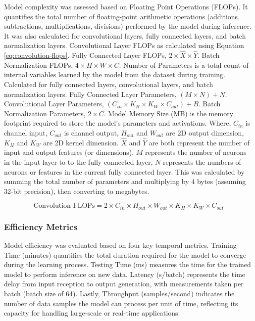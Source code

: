 \documentclass[preprint,12pt]{elsarticle}
\begin{document}
Model complexity was assessed based on Floating Point Operations (FLOPs). It quantifies the total number of floating-point arithmetic operations (additions, subtractions, multiplications, divisions) performed by the model during inference. It was also calculated for convolutional layers, fully connected layers, and batch normalization layers. Convolutional Layer FLOPs as calculated using Equation \ref{eq:convolution-flops}. Fully Connected Layer FLOPs, $2 \times \hat{X} \times \hat{Y}$. Batch Normalization FLOPs, $4 \times H \times W \times C$. Number of Parameters is a total count of internal variables learned by the model from the dataset during training. Calculated for fully connected layers, convolutional layers, and batch normalization layers. Fully Connected Layer Parameters, $(M \times N)+N$. Convolutional Layer Parameters, $(C_{in} \times K_H \times K_W \times C_{out})+B$. Batch Normalization Parameters, $2 \times C$. Model Memory Size (MB) is the memory footprint required to store the model's parameters and activations. Where, $C_{in}$ is channel input, $C_{out}$ is channel output, $H_{out}$ and $W_{out}$ are 2D output dimension, $K_H$ and $K_W$ are 2D kernel dimension. $\hat{X}$ and $\hat{Y}$ are both represent the number of input and output features (or dimensions). $M$ represents the number of neurons in the input layer to to the fully connected layer, $N$ represents the numbers of neurons or features in the current fully connected layer. This was calculated by summing the total number of parameters and multiplying by 4 bytes (assuming 32-bit precision), then converting to megabytes.

\begin{equation}
    \text{Convolution FLOPs} = 2 \times C_{in} \times H_{out} \times W_{out} \times K_H \times K_W \times C_{out}
    \label{eq:convolution-flops}
\end{equation}


\subsubsection{Efficiency Metrics}

Model efficiency was evaluated based on four key temporal metrics. Training Time (minutes) quantifies the total duration required for the model to converge during the learning process. Testing Time (ms) measures the time for the trained model to perform inference on new data. Latency (s/batch) represents the time delay from input reception to output generation, with measurements taken per batch (batch size of 64). Lastly, Throughput (samples/second) indicates the number of data samples the model can process per unit of time, reflecting its capacity for handling large-scale or real-time applications.
\end{document}
